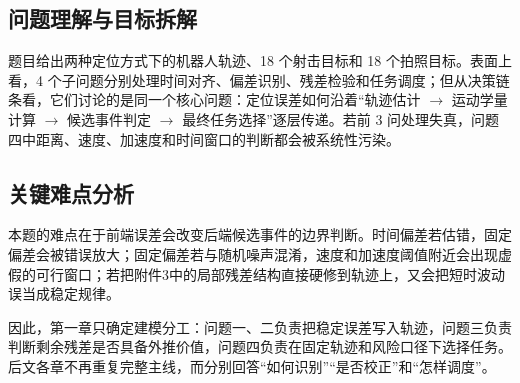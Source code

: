 \documentclass{cumcmthesis}
\begin{document}
\subsection{问题理解与目标拆解}
题目给出两种定位方式下的机器人轨迹、18 个射击目标和 18 个拍照目标。表面上看，4 个子问题分别处理时间对齐、偏差识别、残差检验和任务调度；但从决策链条看，它们讨论的是同一个核心问题：定位误差如何沿着“轨迹估计 $\rightarrow$ 运动学量计算 $\rightarrow$ 候选事件判定 $\rightarrow$ 最终任务选择”逐层传递。若前 3 问处理失真，问题四中距离、速度、加速度和时间窗口的判断都会被系统性污染。

\begin{table}[H]
  \centering
  \caption{四个子问题的目标拆解}
  \label{tab:problem_breakdown}
  \small
\end{table}

\subsection{关键难点分析}
本题的难点在于前端误差会改变后端候选事件的边界判断。时间偏差若估错，固定偏差会被错误放大；固定偏差若与随机噪声混淆，速度和加速度阈值附近会出现虚假的可行窗口；若把附件3中的局部残差结构直接硬修到轨迹上，又会把短时波动误当成稳定规律。

因此，第一章只确定建模分工：问题一、二负责把稳定误差写入轨迹，问题三负责判断剩余残差是否具备外推价值，问题四负责在固定轨迹和风险口径下选择任务。后文各章不再重复完整主线，而分别回答“如何识别”“是否校正”和“怎样调度”。
\end{document}
